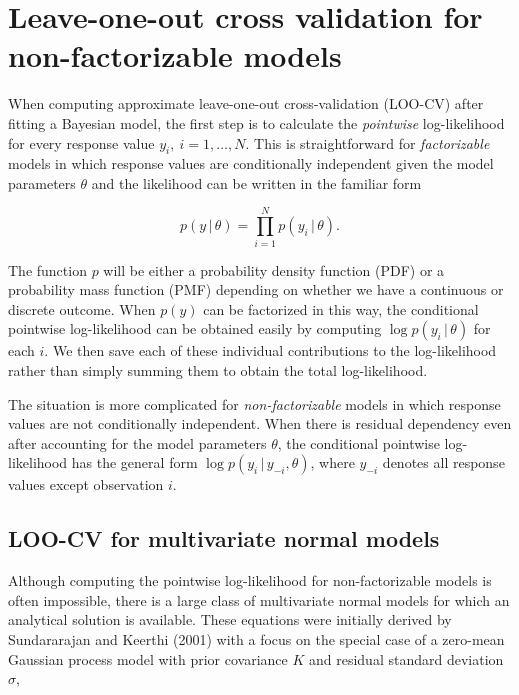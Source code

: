 \documentclass[english,,doc,floatsintext]{apa6}
\theoremstyle{definition}
\theoremstyle{definition}
\theoremstyle{definition}
\theoremstyle{remark}
\begin{document}
\hypertarget{leave-one-out-cross-validation-for-non-factorizable-models}{%
\section{Leave-one-out cross validation for non-factorizable
models}\label{leave-one-out-cross-validation-for-non-factorizable-models}}

When computing approximate leave-one-out cross-validation (LOO-CV) after
fitting a Bayesian model, the first step is to calculate the
\emph{pointwise} log-likelihood for every response value
\(y_i, \: i = 1, \ldots, N\). This is straightforward for
\emph{factorizable} models in which response values are conditionally
independent given the model parameters \(\theta\) and the likelihood can
be written in the familiar form

\begin{equation}
p(y \,|\, \theta) = \prod_{i=1}^N p(y_i \,|\, \theta).
\end{equation}

The function \(p\) will be either a probability density function (PDF)
or a probability mass function (PMF) depending on whether we have a
continuous or discrete outcome. When \(p(y)\) can be factorized in this
way, the conditional pointwise log-likelihood can be obtained easily by
computing \(\log p(y_i \,|\, \theta)\) for each \(i\). We then save each
of these individual contributions to the log-likelihood rather than
simply summing them to obtain the total log-likelihood.

The situation is more complicated for \emph{non-factorizable} models in
which response values are not conditionally independent. When there is
residual dependency even after accounting for the model parameters
\(\theta\), the conditional pointwise log-likelihood has the general
form \(\log p(y_i \,|\, y_{-i}, \theta)\), where \(y_{-i}\) denotes all
response values except observation \(i\).

\hypertarget{loo-cv-for-multivariate-normal-models}{%
\subsection{LOO-CV for multivariate normal
models}\label{loo-cv-for-multivariate-normal-models}}

Although computing the pointwise log-likelihood for non-factorizable
models is often impossible, there is a large class of multivariate
normal models for which an analytical solution is available. These
equations were initially derived by Sundararajan and Keerthi (2001) with
a focus on the special case of a zero-mean Gaussian process model with
prior covariance \(K\) and residual standard deviation \(\sigma\),
\end{document}
